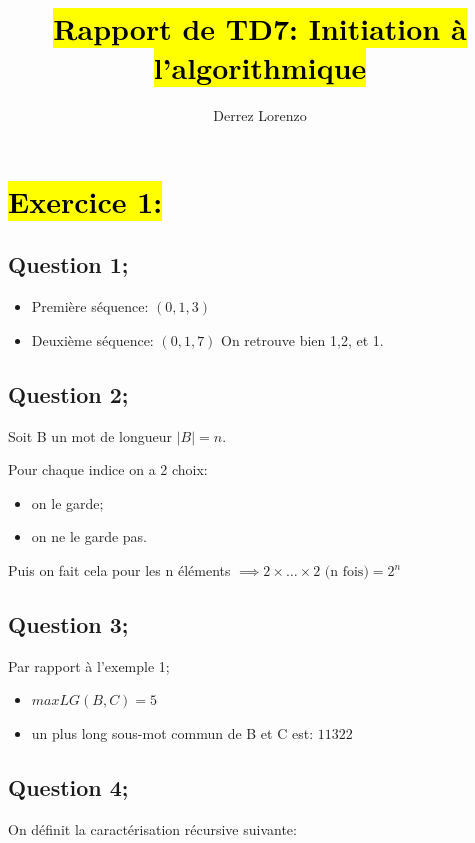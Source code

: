 \documentclass{article}
\title{\sethlcolor{purple!30}\hl{\textbf{Rapport de TD7: Initiation à l'algorithmique}}}
\author{Derrez Lorenzo}
\begin{document}
\maketitle

\section*{\hl{Exercice 1:}}

\subsection*{Question 1;}
\begin{itemize}
    \item Première séquence: $(0,1,3)$ 
    \item Deuxième séquence: $(0,1,7)$
    \subitem On retrouve bien 1,2, et 1.
\end{itemize}

\subsection*{Question 2;}

Soit B un mot de longueur $|B| = n$.

Pour chaque indice on a 2 choix:
\begin{itemize}
    \item on le garde;
    \item on ne le garde pas.
\end{itemize}

Puis on fait cela pour les n éléments $ \implies  2\times \ldots \times 2 \text{ (n fois)}  = 2^n $

\subsection*{Question 3;}

Par rapport à l'exemple 1; 
\begin{itemize}
    \item $ maxLG(B, C) = 5 $
    \item un plus long sous-mot commun de B et C est: $ 1 1 3 2 2 $
\end{itemize}

\subsection*{Question 4;}

On définit la caractérisation récursive suivante:
\end{document}
